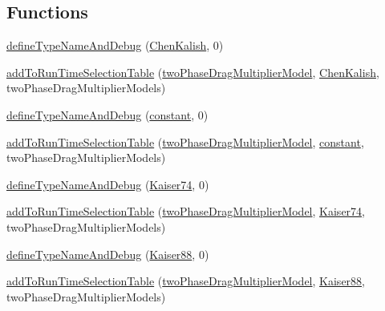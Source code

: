 \subsection*{Functions}
\begin{DoxyCompactItemize}
\item 
\hyperlink{namespaceFoam_1_1twoPhaseDragMultiplierModels_a63fd82bc620633beb2abab71f17578ae}{define\+Type\+Name\+And\+Debug} (\hyperlink{classFoam_1_1twoPhaseDragMultiplierModels_1_1ChenKalish}{Chen\+Kalish}, 0)
\item 
\hyperlink{namespaceFoam_1_1twoPhaseDragMultiplierModels_a7554512fddd53010e621c9c4f935117f}{add\+To\+Run\+Time\+Selection\+Table} (\hyperlink{classFoam_1_1twoPhaseDragMultiplierModel}{two\+Phase\+Drag\+Multiplier\+Model}, \hyperlink{classFoam_1_1twoPhaseDragMultiplierModels_1_1ChenKalish}{Chen\+Kalish}, two\+Phase\+Drag\+Multiplier\+Models)
\item 
\hyperlink{namespaceFoam_1_1twoPhaseDragMultiplierModels_a54dc762846d16386f540dd10429faead}{define\+Type\+Name\+And\+Debug} (\hyperlink{classFoam_1_1twoPhaseDragMultiplierModels_1_1constant}{constant}, 0)
\item 
\hyperlink{namespaceFoam_1_1twoPhaseDragMultiplierModels_a8ba6f2a066ecd89dbc162e016277e51a}{add\+To\+Run\+Time\+Selection\+Table} (\hyperlink{classFoam_1_1twoPhaseDragMultiplierModel}{two\+Phase\+Drag\+Multiplier\+Model}, \hyperlink{classFoam_1_1twoPhaseDragMultiplierModels_1_1constant}{constant}, two\+Phase\+Drag\+Multiplier\+Models)
\item 
\hyperlink{namespaceFoam_1_1twoPhaseDragMultiplierModels_ae43dc5c217f711839b2c3b427ab98b61}{define\+Type\+Name\+And\+Debug} (\hyperlink{classFoam_1_1twoPhaseDragMultiplierModels_1_1Kaiser74}{Kaiser74}, 0)
\item 
\hyperlink{namespaceFoam_1_1twoPhaseDragMultiplierModels_a47bc2be50bb80c8c66363b4d94850e40}{add\+To\+Run\+Time\+Selection\+Table} (\hyperlink{classFoam_1_1twoPhaseDragMultiplierModel}{two\+Phase\+Drag\+Multiplier\+Model}, \hyperlink{classFoam_1_1twoPhaseDragMultiplierModels_1_1Kaiser74}{Kaiser74}, two\+Phase\+Drag\+Multiplier\+Models)
\item 
\hyperlink{namespaceFoam_1_1twoPhaseDragMultiplierModels_afae4e21d7c99ba395020c79ee60da548}{define\+Type\+Name\+And\+Debug} (\hyperlink{classFoam_1_1twoPhaseDragMultiplierModels_1_1Kaiser88}{Kaiser88}, 0)
\item 
\hyperlink{namespaceFoam_1_1twoPhaseDragMultiplierModels_a74f461783e13b2685f2be93721593687}{add\+To\+Run\+Time\+Selection\+Table} (\hyperlink{classFoam_1_1twoPhaseDragMultiplierModel}{two\+Phase\+Drag\+Multiplier\+Model}, \hyperlink{classFoam_1_1twoPhaseDragMultiplierModels_1_1Kaiser88}{Kaiser88}, two\+Phase\+Drag\+Multiplier\+Models)

\end{DoxyCompactItemize}
